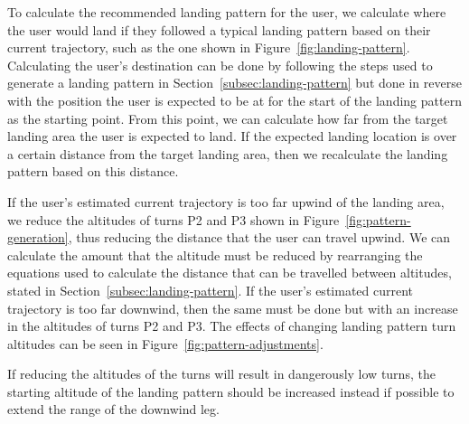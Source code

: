 To calculate the recommended landing pattern for the user, we calculate where the user would land if they followed a typical landing pattern based on their current trajectory, such as the one shown in Figure~\ref{fig:landing-pattern}. Calculating the user's destination can be done by following the steps used to generate a landing pattern in Section~\ref{subsec:landing-pattern} but done in reverse with the position the user is expected to be at for the start of the landing pattern as the starting point.
From this point, we can calculate how far from the target landing area the user is expected to land. If the expected landing location is over a certain distance from the target landing area, then we recalculate the landing pattern based on this distance.

If the user's estimated current trajectory is too far upwind of the landing area, we reduce the altitudes of turns P2 and P3 shown in Figure~\ref{fig:pattern-generation}, thus reducing the distance that the user can travel upwind. We can calculate the amount that the altitude must be reduced by rearranging the equations used to calculate the distance that can be travelled between altitudes, stated in Section~\ref{subsec:landing-pattern}. If the user's estimated current trajectory is too far downwind, then the same must be done but with an increase in the altitudes of turns P2 and P3. The effects of changing landing pattern turn altitudes can be seen in Figure~\vref{fig:pattern-adjustments}.

If reducing the altitudes of the turns will result in dangerously low turns, the starting altitude of the landing pattern should be increased instead if possible to extend the range of the downwind leg.


